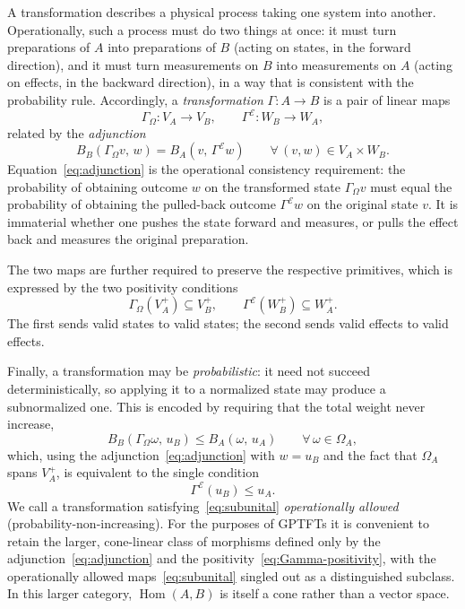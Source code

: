 \documentclass[prl,aps,10pt,superscriptaddress, floatfix]{revtex4-2}
\begin{document}
A transformation describes a physical process taking one system into another. Operationally, such a process must do two things at once: it must turn preparations of $A$ into preparations of $B$ (acting on states, in the forward direction), and it must turn measurements on $B$ into measurements on $A$ (acting on effects, in the backward direction), in a way that is consistent with the probability rule. Accordingly, a \emph{transformation} $\Gamma:A\to B$ is a pair of linear maps
\[
\Gamma_\Omega : V_A \to V_B, \qquad \Gamma^{\mathcal E} : W_B \to W_A,
\]
related by the \emph{adjunction}
\begin{equation}\label{eq:adjunction}
B_B(\Gamma_\Omega v,\,w) = B_A(v,\,\Gamma^{\mathcal E} w)
\qquad \forall\,(v,w)\in V_A\times W_B.
\end{equation}
Equation~\eqref{eq:adjunction} is the operational consistency requirement: the probability of obtaining outcome $w$ on the transformed state $\Gamma_\Omega v$ must equal the probability of obtaining the pulled-back outcome $\Gamma^{\mathcal E} w$ on the original state $v$. It is immaterial whether one pushes the state forward and measures, or pulls the effect back and measures the original preparation.

The two maps are further required to preserve the respective primitives, which is expressed by the two positivity conditions
\begin{equation}\label{eq:Gamma-positivity}
\Gamma_\Omega(V_A^+)\subseteq V_B^+,
\qquad
\Gamma^{\mathcal E}(W_B^+)\subseteq W_A^+.
\end{equation}
The first sends valid states to valid states; the second sends valid effects to valid effects.

Finally, a transformation may be \emph{probabilistic}: it need not succeed deterministically, so applying it to a normalized state may produce a subnormalized one. This is encoded by requiring that the total weight never increase,
\[
B_B(\Gamma_\Omega\omega,\,u_B)\le B_A(\omega,\,u_A)\qquad \forall\,\omega\in\Omega_A,
\]
which, using the adjunction~\eqref{eq:adjunction} with $w=u_B$ and the fact that $\Omega_A$ spans $V_A^+$, is equivalent to the single condition
\begin{equation}\label{eq:subunital}
\Gamma^{\mathcal E}(u_B)\le u_A.
\end{equation}
We call a transformation satisfying~\eqref{eq:subunital} \emph{operationally allowed} (probability-non-increasing). For the purposes of GPTFTs it is convenient to retain the larger, cone-linear class of morphisms defined only by the adjunction~\eqref{eq:adjunction} and the positivity~\eqref{eq:Gamma-positivity}, with the operationally allowed maps~\eqref{eq:subunital} singled out as a distinguished subclass. In this larger category, $\operatorname{Hom}(A,B)$ is itself a cone rather than a vector space.
\end{document}
